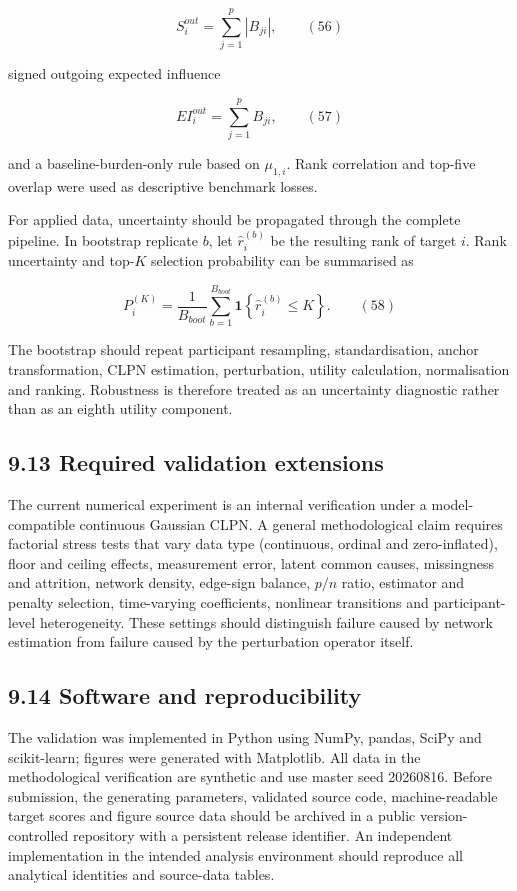 \documentclass[11pt]{article}
\begin{document}
\[S_{i}^{out} = \sum_{j = 1}^{p}\left| B_{ji} \right|,\quad\quad(56)\]

signed outgoing expected influence

\[EI_{i}^{out} = \sum_{j = 1}^{p}B_{ji},\quad\quad(57)\]

and a baseline-burden-only rule based on \(\mu_{1,i}\). Rank correlation
and top-five overlap were used as descriptive benchmark losses.

For applied data, uncertainty should be propagated through the complete
pipeline. In bootstrap replicate \(b\), let \({\widehat{r}}_{i}^{(b)}\)
be the resulting rank of target \(i\). Rank uncertainty and top-\(K\)
selection probability can be summarised as

\[P_{i}^{(K)} = \frac{1}{B_{boot}}\sum_{b = 1}^{B_{boot}}\mathbf{1}\left\{ {\widehat{r}}_{i}^{(b)} \leq K \right\}.\quad\quad(58)\]

The bootstrap should repeat participant resampling, standardisation,
anchor transformation, CLPN estimation, perturbation, utility
calculation, normalisation and ranking. Robustness is therefore treated
as an uncertainty diagnostic rather than as an eighth utility component.

\subsection{9.13 Required validation
extensions}\label{required-validation-extensions}

The current numerical experiment is an internal verification under a
model-compatible continuous Gaussian CLPN. A general methodological
claim requires factorial stress tests that vary data type (continuous,
ordinal and zero-inflated), floor and ceiling effects, measurement
error, latent common causes, missingness and attrition, network density,
edge-sign balance, \(p/n\) ratio, estimator and penalty selection,
time-varying coefficients, nonlinear transitions and participant-level
heterogeneity. These settings should distinguish failure caused by
network estimation from failure caused by the perturbation operator
itself.

\subsection{9.14 Software and
reproducibility}\label{software-and-reproducibility}

The validation was implemented in Python using NumPy, pandas, SciPy and
scikit-learn; figures were generated with Matplotlib. All data in the
methodological verification are synthetic and use master seed 20260816.
Before submission, the generating parameters, validated source code,
machine-readable target scores and figure source data should be archived
in a public version-controlled repository with a persistent release
identifier. An independent implementation in the intended analysis
environment should reproduce all analytical identities and source-data
tables.
\end{document}
